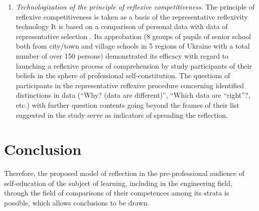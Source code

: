 \documentclass[conference]{IEEEtran}
\begin{document}
\begin{enumerate}
	\item \textit{Technologization of the principle of reflexive competitiveness}. The principle of reflexive competitiveness is taken as a basis of the representative reflexivity technology \cite{b12} It is based on a comparison of personal data with data of representative selection \cite{b12}. Its approbation (8 groups of pupils of senior school both from city/town and village schools in 5 regions of Ukraine with a total number of over 150 persons) demonstrated its efficacy with regard to launching a reflexive process of comprehension by study participants of their beliefs in the sphere of professional self-constitution. The questions of participants in the representative reflexive procedure concerning identified distinctions in data (“Why? (data are different)”, “Which data are “right”?, etc.) with further question contents going beyond the frames of their list suggested in the study serve as indicators of spreading the reflection.

\end{enumerate}

\section{Conclusion}

Therefore, the proposed model of reflection in the pre-professional audience of self-education of the subject of learning, including in the engineering field, through the field of comparisons of their competences among its strata is possible, which allows conclusions to be drawn.
\end{document}
